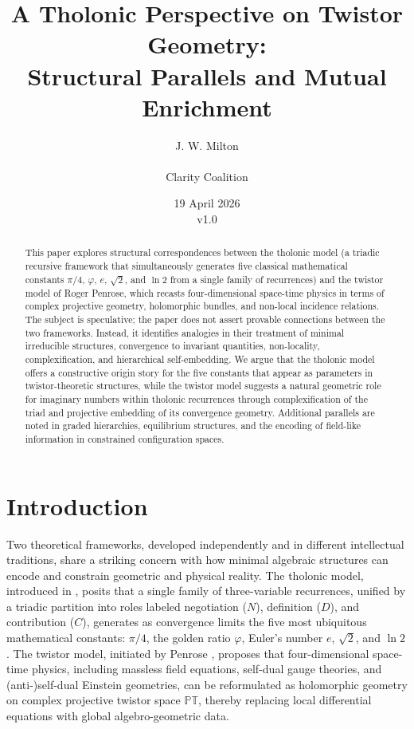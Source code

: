 \documentclass[12pt]{article}
\title{A Tholonic Perspective on Twistor Geometry:\\
        \large Structural Parallels and Mutual Enrichment}
\author{J. W. Milton\\\\[4pt]\small Clarity Coalition}
\date{19 April 2026 \\ \small v1.0}
\begin{document}
\maketitle

\begin{abstract}
This paper explores structural correspondences between the tholonic model (a triadic
recursive framework that simultaneously generates five classical mathematical constants
$\pi/4$, $\varphi$, $e$, $\sqrt{2}$, and $\ln 2$ from a single family of recurrences)
and the twistor model of Roger Penrose, which recasts four-dimensional space-time physics
in terms of complex projective geometry, holomorphic bundles, and non-local incidence
relations.  The subject is speculative; the paper does not assert provable connections
between the two frameworks.  Instead, it identifies analogies in their treatment of
minimal irreducible structures, convergence to invariant quantities, non-locality,
complexification, and hierarchical self-embedding.  We argue that the tholonic model
offers a constructive origin story for the five constants that appear as parameters in
twistor-theoretic structures, while the twistor model suggests a natural geometric role
for imaginary numbers within tholonic recurrences through complexification of the triad
and projective embedding of its convergence geometry.  Additional parallels are noted
in graded hierarchies, equilibrium structures, and the encoding of field-like information
in constrained configuration spaces.
\end{abstract}

\tableofcontents

\section{Introduction}\label{sec:intro}

Two theoretical frameworks, developed independently and in different intellectual
traditions, share a striking concern with how minimal algebraic structures can encode
and constrain geometric and physical reality.  The tholonic model, introduced in
\cite{Mil24}, posits that a single family of three-variable recurrences, unified by a
triadic partition into roles labeled negotiation ($N$), definition ($D$), and
contribution ($C$), generates as convergence limits the five most ubiquitous
mathematical constants: $\pi/4$, the golden ratio $\varphi$, Euler's number $e$,
$\sqrt{2}$, and $\ln 2$.  The twistor model, initiated by Penrose
\cite{Pen67,PR86,PM72}, proposes that four-dimensional space-time physics, including
massless field equations, self-dual gauge theories, and (anti-)self-dual Einstein
geometries, can be reformulated as holomorphic geometry on complex projective twistor
space $\mathbb{PT}$, thereby replacing local differential equations with global
algebro-geometric data.
\end{document}
